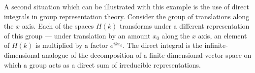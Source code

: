 \documentclass[12pt]{article}
\begin{document}
A second situation which can be illustrated with this example is the use of direct integrals in group representation theory.  Consider the group of translations along the $x$ axis.  Each of the spaces $H(k)$ transforms under a different representation of this group --- under translation by an amount $x_0$ along the $x$ axis, an element of $H(k)$ is multiplied by a factor $e^{i k x_0}$.  The direct integral is the infinite-dimensional analogue of the decomposition of a finite-dimensional vector space on which a group acts as a direct sum of irreducible representations.
\end{document}
